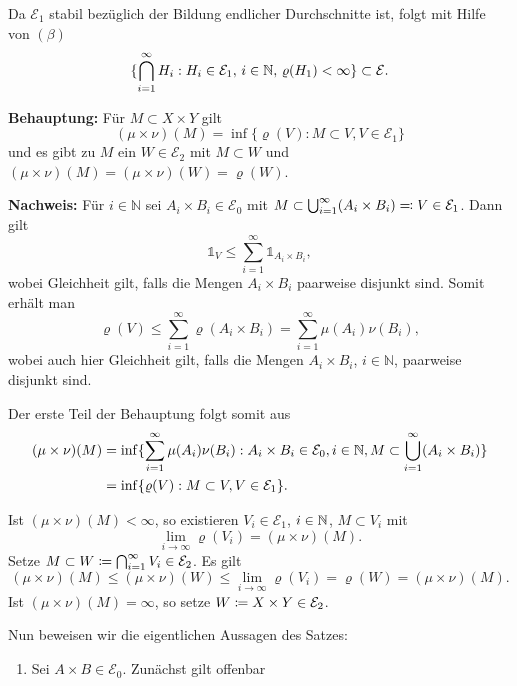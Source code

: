 \documentclass[a4paper,twoside,DIV15,BCOR12mm]{scrbook}
\newcommand{\ind}{\mathds 1}
\begin{document}
\begin{beweis}
Da $\mathcal{E}_1$ stabil bezüglich der Bildung endlicher Durchschnitte ist, folgt mit Hilfe von $(\beta)$
\[
\{\bigcap_{i=1}^\infty H_i : H_i\in\mathcal E_1,\, i\in\mathbb{N},\, \varrho(H_1)<\infty\} \subset \mathcal E.
\]

\textbf{Behauptung:} Für $M\subset X\times Y$ gilt 
\[
(\mu\times\nu)(M) = \inf\{\varrho(V):M\subset V, V\in \mathcal E_1\}
\]
und es gibt zu $M$ ein $W\in\mathcal E_2$ mit $M\subset W$ und $(\mu\times\nu)(M) = (\mu\times\nu)(W) = \varrho (W)$.

\textbf{Nachweis:} Für $i\in\mathbb{N}$ sei $A_i\times B_i  \in \mathcal E_0$ mit $M\subset \bigcup_{i=1}^\infty (A_i\times B_i)\ad V \in\mathcal E_1$. Dann gilt 
$$\ind_V \le \sum_{i=1}^\infty \ind_{A_i\times B_i},
$$ 
wobei Gleichheit gilt, falls die Mengen $A_i\times B_i$ paarweise disjunkt sind. Somit erhält man 
$$\varrho(V) \le \sum_{i=1}^\infty \varrho(A_i\times B_i) = \sum_{i=1}^\infty \mu(A_i) \nu(B_i),
$$ 
wobei auch hier Gleichheit gilt, falls die Mengen $A_i\times B_i$, $i\in\mathbb{N}$, paarweise disjunkt sind.

Der erste Teil der Behauptung folgt somit aus
\begin{align*}
(\mu\times\nu)(M) &= \inf\{\sum_{i=1}^\infty \mu(A_i)\nu(B_i) : A_i\times B_i \in \mathcal E_0, i\in\mathbb{N}, M\subset\bigcup_{i=1}^\infty(A_i\times B_i)\} \\
&= \inf\{\varrho(V): M\subset V, V\in\mathcal E_1\}.
\end{align*}

Ist $(\mu\times \nu)(M)<\infty$, so existieren $V_i\in\mathcal E_1$, $i\in\mathbb{N}$, $M\subset V_i$ mit
\[
\lim_{i\to\infty} \varrho(V_i) = (\mu\times\nu)(M).
\]
Setze $M\subset W \da \bigcap_{i=1}^\infty V_i \in\mathcal E_2$. Es gilt
\[
(\mu\times\nu)(M) \le (\mu\times \nu)(W) \le \lim_{i\to\infty}\varrho(V_i) = \varrho(W) = (\mu\times\nu)(M).
\]
Ist $(\mu\times\nu)(M) =\infty$, so setze $W\da X\times Y\in\mathcal E_2$.

Nun beweisen wir die eigentlichen Aussagen des Satzes:
\begin{enumerate}
\item Sei $A\times B\in\mathcal E_0$. Zunächst gilt offenbar


\end{enumerate}
\end{beweis}
\end{document}
